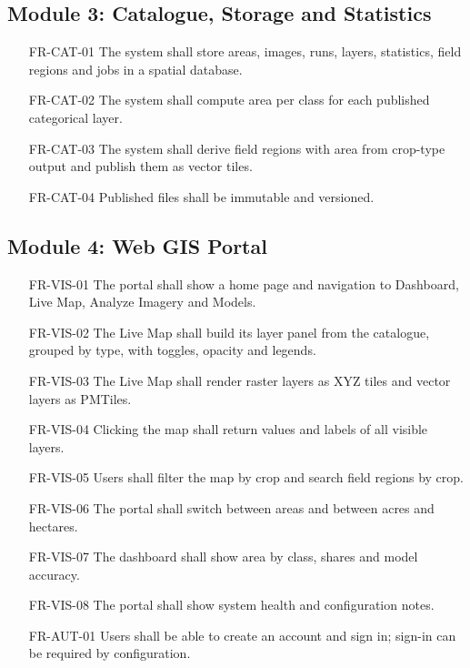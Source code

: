 \subsection{Module 3: Catalogue, Storage and Statistics}
\begin{itemize}[leftmargin=2.2cm]
  \item[FR-CAT-01] The system shall store areas, images, runs, layers, statistics, field regions and
        jobs in a spatial database.
  \item[FR-CAT-02] The system shall compute area per class for each published categorical layer.
  \item[FR-CAT-03] The system shall derive field regions with area from crop-type output and publish
        them as vector tiles.
  \item[FR-CAT-04] Published files shall be immutable and versioned.
\end{itemize}

\subsection{Module 4: Web GIS Portal}
\begin{itemize}[leftmargin=2.2cm]
  \item[FR-VIS-01] The portal shall show a home page and navigation to Dashboard, Live Map, Analyze
        Imagery and Models.
  \item[FR-VIS-02] The Live Map shall build its layer panel from the catalogue, grouped by type, with
        toggles, opacity and legends.
  \item[FR-VIS-03] The Live Map shall render raster layers as XYZ tiles and vector layers as PMTiles.
  \item[FR-VIS-04] Clicking the map shall return values and labels of all visible layers.
  \item[FR-VIS-05] Users shall filter the map by crop and search field regions by crop.
  \item[FR-VIS-06] The portal shall switch between areas and between acres and hectares.
  \item[FR-VIS-07] The dashboard shall show area by class, shares and model accuracy.
  \item[FR-VIS-08] The portal shall show system health and configuration notes.
  \item[FR-AUT-01] Users shall be able to create an account and sign in; sign-in can be required by
        configuration.
\end{itemize}

